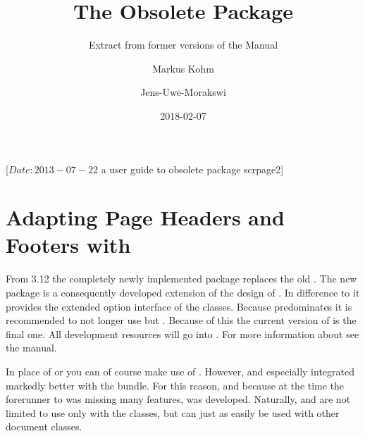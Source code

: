 %
                 [$Date: 2013-07-22 $
                  a user guide to obsolete package scrpage2]



\def\theHchapter{E.\thechapter}
\setcounter{chapter}{0}
\renewcommand*{\thepage}{E.\arabic{page}}
\title{The Obsolete Package }
\subtitle{Extract from former versions of the \KOMAScript{} Manual}
\author{Markus Kohm\and Jens-Uwe-Morakswi}
\date{2018-02-07}
\maketitle

\tableofcontents


\chapter{Adapting Page Headers and Footers with }

%
\BeginIndexGroup
{}%
From \KOMAScript{} 3.12 the completely newly implemented package
 replaces the old . The new
package is a consequently developed extension of the design of
. In difference to  it provides the
extended option interface of the \KOMAScript{} classes. Because
 predominates  it is recommended
to not longer use  but . Because
of this the current version of  is the final one. All
development resources will go into . For more
information about  see the \KOMAScript{} manual.

\begin{Explain}
  In place of  or  you can of
  course make use of . However,  and
  especially  integrated markedly better with the
  {\KOMAScript} bundle. For this reason, and because at the time the
  forerunner to  was missing many features,
   was developed. Naturally,  and
   are not limited to use only with the
  {\KOMAScript} classes, but can just as easily be used with other document
  classes.
\end{Explain}


